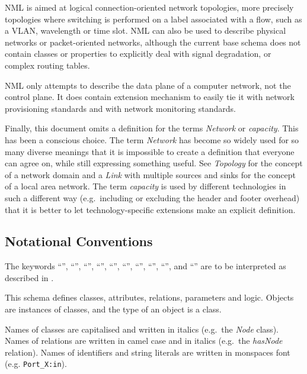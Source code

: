 NML is aimed at logical connection-oriented network topologies, more precisely topologies
where switching is performed on a label associated with a flow, such as a VLAN, wavelength or time slot. 
NML can also be used to describe physical networks or packet-oriented networks, 
although the current base schema does not contain classes or properties 
to explicitly deal with signal degradation, or complex routing tables.

NML only attempts to describe the data plane of a computer network, not the control 
plane. It does contain extension mechanism to easily tie it with network provisioning 
standards and with network monitoring standards.

Finally, this document omits a definition for the terms \emph{Network} or \emph{capacity}. 
This has been a conscious choice. The term \emph{Network} has become 
so widely used for so many diverse meanings that it is impossible to create a 
definition that everyone can agree on, while still expressing something useful.
See \emph{Topology} for the concept of a network domain and a \emph{Link} with multiple 
sources and sinks for the concept of a local area network.
The term \emph{capacity} is used by different technologies in such a different 
way (e.g.\ including or excluding the header and footer overhead) that it is better 
to let technology-specific extensions make an explicit definition.

\subsection{Notational Conventions}%
\label{sec:rfc2119}

The keywords “\MUST{}”, “\MUSTNOT{}”, “\REQUIRED{}”, “\SHALL{}”, “\SHALLNOT{}”, 
“\SHOULD{}”, “\SHOULDNOT{}”, “\RECOMMENDED{}”, “\MAY{}”,  and “\OPTIONAL{}” are 
to be interpreted as described in \cite{rfc2119}.

This schema defines classes, attributes, relations, parameters and logic.
Objects are instances of classes, and the type of an object is a class.

Names of classes are capitalised and written in italics (e.g.\ the \emph{Node} class).
Names of relations are written in camel case and in italics (e.g.\ the \emph{hasNode} relation).
Names of identifiers and string literals are written in monspaces font (e.g. \texttt{Port\_X:in}).

